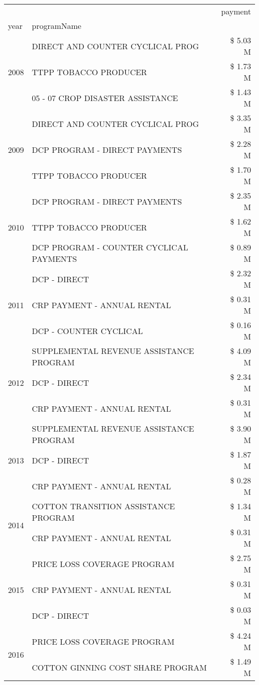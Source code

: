 \begin{tabular}{llr}
\toprule
 &  & payment \\
year & programName &  \\
\midrule
\multirow[t]{3}{*}{2008} & DIRECT AND COUNTER CYCLICAL PROG & \$ 5.03 M \\
 & TTPP TOBACCO PRODUCER & \$ 1.73 M \\
 & 05 - 07 CROP DISASTER ASSISTANCE & \$ 1.43 M \\
\cline{1-3}
\multirow[t]{3}{*}{2009} & DIRECT AND COUNTER CYCLICAL PROG & \$ 3.35 M \\
 & DCP PROGRAM - DIRECT PAYMENTS & \$ 2.28 M \\
 & TTPP TOBACCO PRODUCER & \$ 1.70 M \\
\cline{1-3}
\multirow[t]{3}{*}{2010} & DCP PROGRAM - DIRECT PAYMENTS & \$ 2.35 M \\
 & TTPP TOBACCO PRODUCER & \$ 1.62 M \\
 & DCP PROGRAM - COUNTER CYCLICAL PAYMENTS & \$ 0.89 M \\
\cline{1-3}
\multirow[t]{3}{*}{2011} & DCP - DIRECT & \$ 2.32 M \\
 & CRP PAYMENT - ANNUAL RENTAL & \$ 0.31 M \\
 & DCP - COUNTER CYCLICAL & \$ 0.16 M \\
\cline{1-3}
\multirow[t]{3}{*}{2012} & SUPPLEMENTAL REVENUE ASSISTANCE PROGRAM & \$ 4.09 M \\
 & DCP - DIRECT & \$ 2.34 M \\
 & CRP PAYMENT - ANNUAL RENTAL & \$ 0.31 M \\
\cline{1-3}
\multirow[t]{3}{*}{2013} & SUPPLEMENTAL REVENUE ASSISTANCE PROGRAM & \$ 3.90 M \\
 & DCP - DIRECT & \$ 1.87 M \\
 & CRP PAYMENT - ANNUAL RENTAL & \$ 0.28 M \\
\cline{1-3}
\multirow[t]{2}{*}{2014} & COTTON TRANSITION ASSISTANCE PROGRAM & \$ 1.34 M \\
 & CRP PAYMENT - ANNUAL RENTAL & \$ 0.31 M \\
\cline{1-3}
\multirow[t]{3}{*}{2015} & PRICE LOSS COVERAGE PROGRAM & \$ 2.75 M \\
 & CRP PAYMENT - ANNUAL RENTAL & \$ 0.31 M \\
 & DCP - DIRECT & \$ 0.03 M \\
\cline{1-3}
\multirow[t]{3}{*}{2016} & PRICE LOSS COVERAGE PROGRAM & \$ 4.24 M \\
 & COTTON GINNING COST SHARE PROGRAM & \$ 1.49 M \\

\end{tabular}
